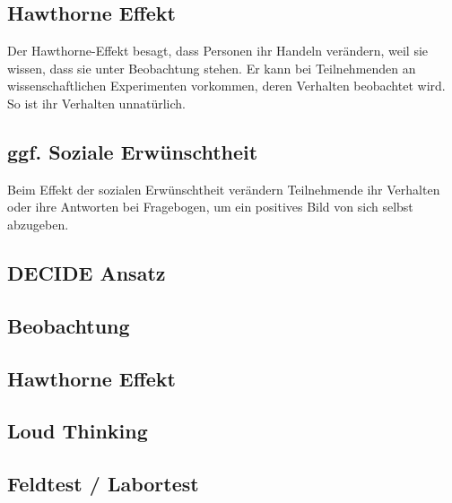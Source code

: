 \subsection{Hawthorne Effekt}
Der Hawthorne-Effekt besagt, dass Personen ihr Handeln verändern, weil sie wissen, dass sie unter Beobachtung stehen. Er kann bei Teilnehmenden an wissenschaftlichen Experimenten vorkommen, deren Verhalten beobachtet wird. So ist ihr Verhalten unnatürlich.

\subsection{ggf. Soziale Erwünschtheit}
\grqq{}Beim Effekt der sozialen Erwünschtheit verändern Teilnehmende ihr Verhalten oder ihre Antworten bei Fragebogen, um ein positives Bild von sich selbst abzugeben.\glqq 

\subsection{DECIDE Ansatz}
\subsection{Beobachtung}
\subsection{Hawthorne Effekt}
\subsection{Loud Thinking}
\subsection{Feldtest / Labortest}

